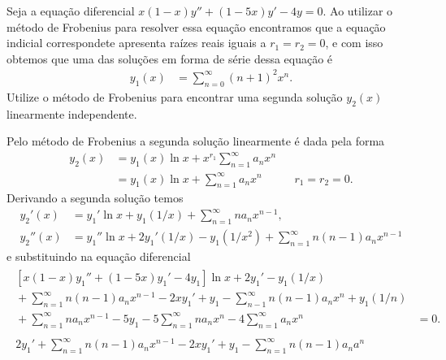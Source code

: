 \documentclass[a4paper,12pt, leqno, answers]{exam}
\begin{document}
\begin{questions}
\begin{solution}
    \end{solution}

    \question[T2 de 2012] Seja a equa\c{c}\~{a}o diferencial $x(1 - x) y'' + (1 - 5x) y' - 4y = 0$. Ao utilizar o m\'{e}todo de Frobenius para resolver essa equa\c{c}\~{a}o encontramos que a equa\c{c}\~{a}o indicial correspondete apresenta ra\'{i}zes reais iguais a $r_1 = r_2 = 0$, e com isso obtemos que uma das solu\c{c}\~{o}es em forma de s\'{e}rie dessa equa\c{c}\~{a}o \'{e}
    \begin{align*}
        y_1(x) &= \sum_{n = 0}^\infty (n + 1)^2 x^n.
    \end{align*}
    Utilize o m\'{e}todo de Frobenius para encontrar uma segunda solu\c{c}\~{a}o $y_2(x)$ linearmente independente.
    \begin{solution}
        Pelo m\'{e}todo de Frobenius a segunda solu\c{c}\~{a}o linearmente \'{e} dada pela forma
        \begin{align*}
            y_2(x) &= y_1(x) \ln x + x^{r_1} \sum_{n = 1}^\infty a_n x^n \\
            &= y_1(x) \ln x + \sum_{n = 1}^\infty a_n x^n && r_1 = r_2 = 0.
        \end{align*}
        Derivando a segunda solu\c{c}\~{a}o temos
        \begin{align*}
            y_2'(x) &= y_1' \ln x + y_1 (1/x) + \sum_{n = 1}^\infty n a_n x^{n - 1}, \\
            y_2''(x) &= y_1'' \ln x + 2 y_1' (1/x) - y_1 (1/x^2) + \sum_{n = 1}^\infty n (n - 1) a_n x^{n - 1}
        \end{align*}
        e substituindo na equa\c{c}\~{a}o diferencial
        \begin{align*}
            \begin{split}
                \left[ x (1 - x) y_1'' + (1 - 5x) y_1' - 4y_1 \right] \ln x + 2 y_1' - y_1 (1/x) & \\
                {}+ \sum_{n = 1}^\infty n (n - 1) a_n x^{n - 1} - 2 x y_1' + y_1 - \sum_{n - 1}^\infty n (n - 1) a_n x^n + y_1 (1/n) & \\
                {}+ \sum_{n = 1}^\infty n a_n x^{n - 1} - 5y_1 - 5 \sum_{n = 1}^\infty n a_n x^n - 4 \sum_{n = 1}^\infty a_n x^n &= 0.
            \end{split} \\
            \begin{split}
                2 y_1' + \sum_{n = 1}^\infty n (n - 1) a_n x^{n - 1} - 2 x y_1' + y_1 - \sum_{n = 1}^\infty n (n - 1) a_n a^n & \\

\end{split}
\end{align*}
\end{solution}
\end{questions}
\end{document}
